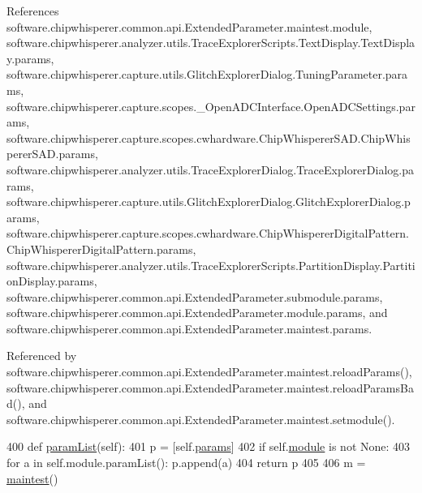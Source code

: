 References software.\+chipwhisperer.\+common.\+api.\+Extended\+Parameter.\+maintest.\+module, software.\+chipwhisperer.\+analyzer.\+utils.\+Trace\+Explorer\+Scripts.\+Text\+Display.\+Text\+Display.\+params, software.\+chipwhisperer.\+capture.\+utils.\+Glitch\+Explorer\+Dialog.\+Tuning\+Parameter.\+params, software.\+chipwhisperer.\+capture.\+scopes.\+\_\+\+Open\+A\+D\+C\+Interface.\+Open\+A\+D\+C\+Settings.\+params, software.\+chipwhisperer.\+capture.\+scopes.\+cwhardware.\+Chip\+Whisperer\+S\+A\+D.\+Chip\+Whisperer\+S\+A\+D.\+params, software.\+chipwhisperer.\+analyzer.\+utils.\+Trace\+Explorer\+Dialog.\+Trace\+Explorer\+Dialog.\+params, software.\+chipwhisperer.\+capture.\+utils.\+Glitch\+Explorer\+Dialog.\+Glitch\+Explorer\+Dialog.\+params, software.\+chipwhisperer.\+capture.\+scopes.\+cwhardware.\+Chip\+Whisperer\+Digital\+Pattern.\+Chip\+Whisperer\+Digital\+Pattern.\+params, software.\+chipwhisperer.\+analyzer.\+utils.\+Trace\+Explorer\+Scripts.\+Partition\+Display.\+Partition\+Display.\+params, software.\+chipwhisperer.\+common.\+api.\+Extended\+Parameter.\+submodule.\+params, software.\+chipwhisperer.\+common.\+api.\+Extended\+Parameter.\+module.\+params, and software.\+chipwhisperer.\+common.\+api.\+Extended\+Parameter.\+maintest.\+params.



Referenced by software.\+chipwhisperer.\+common.\+api.\+Extended\+Parameter.\+maintest.\+reload\+Params(), software.\+chipwhisperer.\+common.\+api.\+Extended\+Parameter.\+maintest.\+reload\+Params\+Bad(), and software.\+chipwhisperer.\+common.\+api.\+Extended\+Parameter.\+maintest.\+setmodule().


\begin{DoxyCode}
400         \textcolor{keyword}{def }\hyperlink{classsoftware_1_1chipwhisperer_1_1common_1_1api_1_1ExtendedParameter_1_1maintest_a606a166e28d055ecec331cb4172f9fe4}{paramList}(self):
401             p = [self.\hyperlink{classsoftware_1_1chipwhisperer_1_1common_1_1api_1_1ExtendedParameter_1_1maintest_aefa1ef95d164e89a25d411223e78f525}{params}]
402             \textcolor{keywordflow}{if} self.\hyperlink{classsoftware_1_1chipwhisperer_1_1common_1_1api_1_1ExtendedParameter_1_1maintest_ad6bf58713cf6c1d36d9774022c5539cd}{module} \textcolor{keywordflow}{is} \textcolor{keywordflow}{not} \textcolor{keywordtype}{None}:
403                 \textcolor{keywordflow}{for} a \textcolor{keywordflow}{in} self.module.paramList(): p.append(a)
404             \textcolor{keywordflow}{return} p
405 
406     m = \hyperlink{classsoftware_1_1chipwhisperer_1_1common_1_1api_1_1ExtendedParameter_1_1maintest}{maintest}()
\end{DoxyCode}
\hypertarget{classsoftware_1_1chipwhisperer_1_1common_1_1api_1_1ExtendedParameter_1_1maintest_a454f447369cf0b4c8dae7ebc1cf99458}{}
